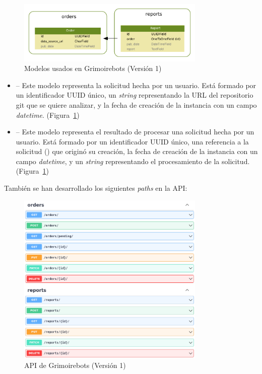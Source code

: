 \begin{figure}[ht]
    \centering
    \includegraphics[width=0.8\textwidth]{Figures/grimoirebots_i_models}
    \decoRule
    \caption[Grimoirebots I (modelos)]{Modelos usados en Grimoirebots (Versión 1)}
    \label{fig:grimoirebots_i_models}
\end{figure}

\begin{itemize}
    \item {} -- Este modelo representa la solicitud hecha por un usuario. Está formado por un identificador UUID único, un \emph{string} representando la URL del repositorio git que se quiere analizar, y la fecha de creación de la instancia con un campo \emph{datetime}. (Figura~\ref{fig:grimoirebots_i_models})
    \item {} -- Este modelo representa el resultado de procesar una solicitud hecha por un usuario. Está formado por un identificador UUID único, una referencia a la solicitud () que originó su creación, la fecha de creación de la instancia con un campo \emph{datetime}, y un \emph{string} representando el procesamiento de la solicitud. (Figura~\ref{fig:grimoirebots_i_models})
\end{itemize}

También se han desarrollado los siguientes \emph{paths} en la API:

\begin{figure}[ht]
    \centering
    \includegraphics[width=0.8\textwidth]{Figures/grimoirebots_i_api}
    \decoRule
    \caption[Grimoirebots I (API)]{API de Grimoirebots (Versión 1)}
    \label{fig:grimoirebots_i_api}
\end{figure}

